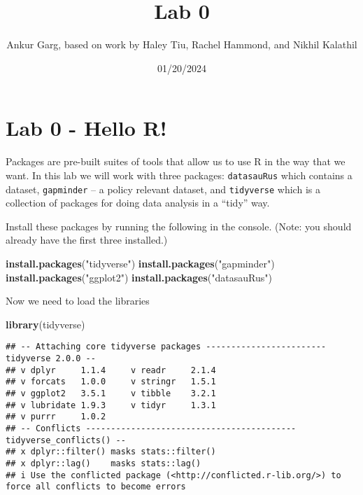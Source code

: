 \documentclass[
]{article}
\title{Lab 0}
\author{Ankur Garg, based on work by Haley Tiu, Rachel Hammond, and
Nikhil Kalathil}
\date{01/20/2024}
\newenvironment{Shaded}{\begin{snugshade}}{\end{snugshade}}
\newcommand{\FunctionTok}[1]{\textcolor[rgb]{0.13,0.29,0.53}{\textbf{#1}}}
\newcommand{\NormalTok}[1]{#1}
\newcommand{\StringTok}[1]{\textcolor[rgb]{0.31,0.60,0.02}{#1}}
\begin{document}
\maketitle

\section{Lab 0 - Hello R!}\label{lab-0---hello-r}

Packages are pre-built suites of tools that allow us to use R in the way
that we want. In this lab we will work with three packages:
\texttt{datasauRus} which contains a dataset, \texttt{gapminder} -- a
policy relevant dataset, and \texttt{tidyverse} which is a collection of
packages for doing data analysis in a ``tidy'' way.

Install these packages by running the following in the console. (Note:
you should already have the first three installed.)

\begin{Shaded}
\begin{Highlighting}[]
\FunctionTok{install.packages}\NormalTok{(}\StringTok{"tidyverse"}\NormalTok{)}
\FunctionTok{install.packages}\NormalTok{(}\StringTok{"gapminder"}\NormalTok{)}
\FunctionTok{install.packages}\NormalTok{(}\StringTok{"ggplot2"}\NormalTok{)}
\FunctionTok{install.packages}\NormalTok{(}\StringTok{"datasauRus"}\NormalTok{)}
\end{Highlighting}
\end{Shaded}

Now we need to load the libraries

\begin{Shaded}
\begin{Highlighting}[]
\FunctionTok{library}\NormalTok{(tidyverse) }
\end{Highlighting}
\end{Shaded}

\begin{verbatim}
## -- Attaching core tidyverse packages ------------------------ tidyverse 2.0.0 --
## v dplyr     1.1.4     v readr     2.1.4
## v forcats   1.0.0     v stringr   1.5.1
## v ggplot2   3.5.1     v tibble    3.2.1
## v lubridate 1.9.3     v tidyr     1.3.1
## v purrr     1.0.2     
## -- Conflicts ------------------------------------------ tidyverse_conflicts() --
## x dplyr::filter() masks stats::filter()
## x dplyr::lag()    masks stats::lag()
## i Use the conflicted package (<http://conflicted.r-lib.org/>) to force all conflicts to become errors
\end{verbatim}
\end{document}
